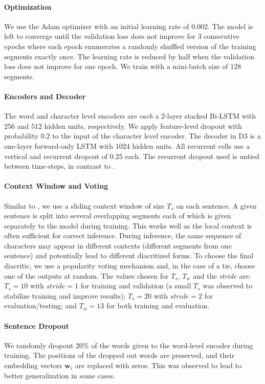 \documentclass[11pt]{article}
\begin{document}
\paragraph{Optimization}
We use the Adam optimizer \cite{adam14} with an initial learning rate of $0.002$. The model is left to converge until the validation loss does not improve for $3$ consecutive epochs where each epoch enumerates a randomly shuffled version of the training segments exactly once. The learning rate is reduced by half when the validation loss does not improve for one epoch. We train with a mini-batch size of $128$ segments.

\paragraph{Encoders and Decoder}
\label{exp:enc-dec}
The word and character level encoders are \emph{each} a 2-layer stacked Bi-LSTM with $256$ and $512$ hidden units, respectively. We apply feature-level dropout \cite{dropout} with probability $0.2$ to the input of the character level encoder. The decoder in D3 is a one-layer forward-only LSTM with $1024$ hidden units. All recurrent cells use a vertical and recurrent dropout of $0.25$ each. The recurrent dropout used is untied between time-steps, in contrast to \cite{rec-dropout}.

\paragraph{Context Window and Voting}
\label{exp:voting}
Similar to \cite{mubarak19-highly}, we use a sliding context window of size $T_s$ on each sentence. A given sentence is split into several overlapping segments each of which is given separately to the model during training. This works well as the local context is often sufficient for correct inference. During inference, the same sequence of characters may appear in different contexts (different segments from one sentence) and potentially lead to different diacritized forms. To choose the final diacritic, we use a popularity voting mechanism and, in the case of a tie, choose one of the outputs at random. The values chosen for $T_s$, $T_w$ and the \textit{stride} are: $T_s=10$ with $\textit{stride} = 1$ for training and validation (a small $T_s$ was observed to stabilize training and improve results); $T_s=20$ with $\textit{stride} = 2$ for evaluation/testing; and $T_w=13$ for both training and evaluation.

\paragraph{Sentence Dropout}
\label{exp:sdo}
We randomly dropout 20\% of the words given to the word-level encoder during training. The positions of the dropped out words are preserved, and their embedding vectors $\mathbf{w}_i$ are replaced with zeros. This was observed to lead to better generalization in some cases.
\end{document}

